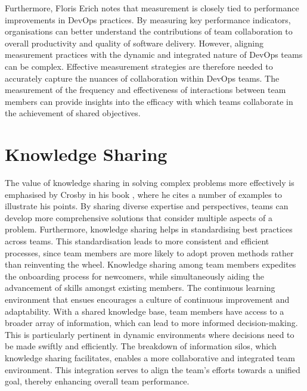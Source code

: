 Furthermore, Floris Erich \cite{Erich2017DevOps} notes that measurement is closely tied to performance improvements in \ac{DevOps} practices. By measuring key performance indicators, organisations can better understand the contributions of team collaboration to overall productivity and quality of software delivery. However, aligning measurement practices with the dynamic and integrated nature of \ac{DevOps} teams can be complex. Effective measurement strategies are therefore needed to accurately capture the nuances of collaboration within \ac{DevOps} teams. The measurement of the frequency and effectiveness of interactions between team members can provide insights into the efficacy with which teams collaborate in the achievement of shared objectives.


\section{Knowledge Sharing}


The value of knowledge sharing in solving complex problems more effectively is emphasised by Crosby in his book \cite{Crosby2023}, where he cites a number of examples to illustrate his points. By sharing diverse expertise and perspectives, teams can develop more comprehensive solutions that consider multiple aspects of a problem. Furthermore, knowledge sharing helps in standardising best practices across teams. This standardisation leads to more consistent and efficient processes, since team members are more likely to adopt proven methods rather than reinventing the wheel. Knowledge sharing among team members expedites the onboarding process for newcomers, while simultaneously aiding the advancement of skills amongst existing members. The continuous learning environment that ensues encourages a culture of continuous improvement and adaptability. With a shared knowledge base, team members have access to a broader array of information, which can lead to more informed decision-making. This is particularly pertinent in dynamic environments where decisions need to be made swiftly and efficiently. The breakdown of information silos, which knowledge sharing facilitates, enables a more collaborative and integrated team environment. This integration serves to align the team's efforts towards a unified goal, thereby enhancing overall team performance.


